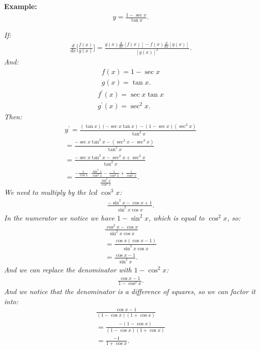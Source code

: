 \documentclass{report}
\begin{document}
  \bigbreak \noindent 
  \begin{mdframed}
    \textbf{Example:}
    \begin{align*}
      y=  \frac{1- \sec{x}}{ \tan{x}}
    .\end{align*}
  \end{mdframed}
  \textit{If:}
  \begin{align*}
    \frac{d}{dx}\bigg[ \frac{f(x)}{g(x)}\bigg] = \frac{g(x) \frac{d}{dx}[f(x)] - f(x) \frac{d}{dx}[g(x)]}{[g(x)]^2}
  .\end{align*}
  \textit{And:}
  \begin{align*}
    f(x) = 1- \sec{x} \\
    g(x) = \tan{x}
  .\end{align*}
  \begin{align*}
    f ^{\prime}(x) = \sec{x} \tan{x} \\ 
    g ^{\prime}(x) = \sec^2{x}
  .\end{align*}
  \textit{Then:}
  \begin{align*}
    y ^{\prime} = \frac{( \tan{x})(- \sec{x} \tan{x}) - (1 - \sec{x})( \sec^2{x})}{ \tan^2{x} } \\ 
    =  \frac{ - \sec{x} \tan^2{x}- (\sec^2{x} - \sec^3{x})}{\tan^2{x}} \\ 
    =  \frac{ - \sec{x} \tan^2{x}-\sec^2{x} + \sec^3{x}}{\tan^2{x}} \\ 
    = \frac{- \frac{1}{ \cos{x}} \cdot \frac{ \sin^2{x}}{ \cos^2{x}} - \frac{1}{ \cos^2{x}} + \frac{1}{ \cos^3{x}}}{ \frac{ \sin^2{x}}{ \cos^2{x}}}
  .\end{align*}
  \textit{We need to multiply by the lcd $ \cos^3{x}$:}
  \begin{align*}
    \frac{- \sin^2{x} - \cos{x} + 1}{ \sin^2{x} \cos{x}} 
  .\end{align*}
  \bigbreak \noindent 
  \textit{In the numerator we notice we have $ 1- \sin^2{x}$, which is equal to $ \cos^2{x}$, so:}
  \begin{align*}
    \frac{ \cos^2{x} - \cos{x}}{ \sin^2{x} \cos{x}} \\ 
    = \frac{ \cos{x}( \cos{x} - 1)}{ \sin^2{x} \cos{x}} \\ 
    = \frac{ \cos{x} -1}{ \sin^2{x}}
  .\end{align*}
  \bigbreak \noindent 
  \textit{And we can replace the denominator with $ 1- \cos^2{x}$:}
  \begin{align*}
    \frac{ \cos{x} -1}{1 - \cos^2{x}}
  .\end{align*}
  \bigbreak \noindent 
  \textit{And we notice that the denominator is a difference of squares, so we can factor it into:}
  \begin{align*}
    \frac{ \cos{x} -1}{(1 - \cos{x})(1 + \cos{x})} \\ 
    = \frac{- (1 - \cos{x})}{(1 - \cos{x})(1 + \cos{x})} \\ 
    = \frac{- 1}{1 + \cos{x}}
  .\end{align*}
\end{document}
